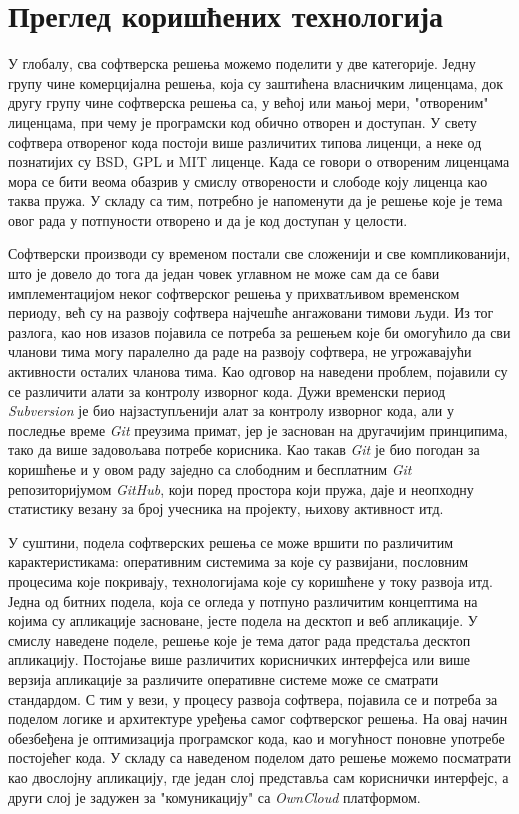 \chapter{Преглед коришћених технологија}
\label{chap:Pregled koriscenih tehnologija}

У глобалу, сва софтверска решења можемо поделити у две категорије. Једну групу чине комерцијална решења, која су заштићена власничким лиценцама, док другу групу чине софтверска решења са, у већој или мањој мери, "отвореним" лиценцама, при чему је програмски код обично отворен и доступан. У свету софтвера отвореног кода постоји више различитих типова лиценци, а неке од познатијих су BSD, GPL и MIT\cite{licence} лиценце. Када се говори о отвореним лиценцама мора се бити веома обазрив у смислу отворености и слободе коју лиценца као таква пружа. У складу са тим, потребно је напоменути да је решење које је тема овог рада у потпуности отворено и да је код доступан у целости. 

Софтверски производи су временом постали све сложенији и све компликованији, што је довело до тога да један човек углавном не може сам да се бави имплементацијом неког софтверског решења у прихватљивом временском периоду, већ су на развоју софтвера најчешће ангажовани тимови људи. Из тог разлога, као нов изазов појавила се потреба за решењем које би омогућило да сви чланови тима могу паралелно да раде на развоју софтвера, не угрожавајући активности осталих чланова тима. Као одговор на наведени проблем, појавили су се различити алати за контролу изворног кода. Дужи временски период \textit{Subversion} је био најзаступљенији алат за контролу изворног кода, али у последње време \textit{Git}\cite{git} преузима примат, јер је заснован на другачијим принципима, тако да више задовољава потребе корисника. Као такав \textit{Git} је био погодан за коришћење и у овом раду заједно са слободним и бесплатним \textit{Git} репозиторијумом \textit{GitHub}\cite{github}, који поред простора који пружа, даје и неопходну статистику везану за број учесника на пројекту, њихову активност итд.

У суштини, подела софтверских решења се може  вршити по различитим карактеристикама: оперативним системима за које су развијани, пословним процесима које покривају, технологијама које су коришћене у току развоја итд. Једна од битних подела, која се огледа у потпуно различитим концептима на којима су апликације засноване, јесте подела на десктоп и веб апликације. У смислу наведене поделе, решење које је тема датог рада предстаља десктоп апликацију. Постојање више различитих корисничких интерфејса или више верзија апликације за различите оперативне системе може се сматрати стандардом. С тим у вези, у процесу развоја софтвера, појавила се и потреба за поделом логике и архитектуре уређења самог софтверског решења. На овај начин обезбеђена је оптимизација програмског кода, као и могућност поновне употребе постојећег кода. У складу са наведеном поделом дато решење можемо посматрати као двослојну апликацију, где један слој представља сам кориснички интерфејс, а други слој је задужен за "комуникацију" са \textit{OwnCloud} платформом. 

